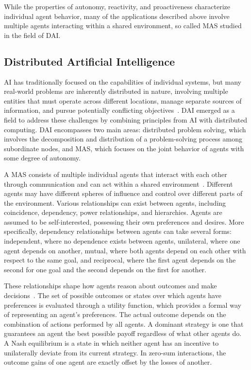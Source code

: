 \documentclass[
english,                 %
bibtex,                  %
includeExtraAbstracts, %
]{kththesis}
\numberwithin{listing}{chapter}
\begin{document}
While the properties of autonomy, reactivity, and proactiveness characterize individual agent behavior, many of the applications described above involve multiple agents interacting within a shared environment, so called \gls{MAS} studied in the field of \gls{DAI}.

\subsection{Distributed Artificial Intelligence}

\Gls{AI} has traditionally focused on the capabilities of individual systems, but many real-world problems are inherently distributed in nature, involving multiple entities that must operate across different locations, manage separate sources of information, and pursue potentially conflicting objectives~\cite{panait_cooperative_2005}. \Gls{DAI} emerged as a field to address these challenges by combining principles from \gls{AI} with distributed computing. \Gls{DAI} encompasses two main areas: distributed problem solving, which involves the decomposition and distribution of a problem-solving process among subordinate nodes, and \gls{MAS}, which focuses on the joint behavior of agents with some degree of autonomy.

A \gls{MAS} consists of multiple individual agents that interact with each other through communication and can act within a shared environment~\cite{wooldridge_introduction_2012}. Different agents may have different spheres of influence and control over different parts of the environment. Various relationships can exist between agents, including coincidence, dependency, power relationships, and hierarchies. Agents are assumed to be self-interested, possessing their own preferences and desires. More specifically, dependency relationships between agents can take several forms: independent, where no dependence exists between agents, unilateral, where one agent depends on another, mutual, where both agents depend on each other with respect to the same goal, and reciprocal, where the first agent depends on the second for one goal and the second depends on the first for another.

These relationships shape how agents reason about outcomes and make decisions~\cite{wooldridge_introduction_2012}. The set of possible outcomes or states over which agents have preferences is evaluated through a utility function, which provides a formal way of representing an agent's preferences. The actual outcome depends on the combination of actions performed by all agents. A dominant strategy is one that guarantees an agent the best possible payoff regardless of what other agents do. A Nash equilibrium is a state in which neither agent has an incentive to unilaterally deviate from its current strategy. In zero-sum interactions, the outcome gains of one agent are exactly offset by the losses of another.
\end{document}
